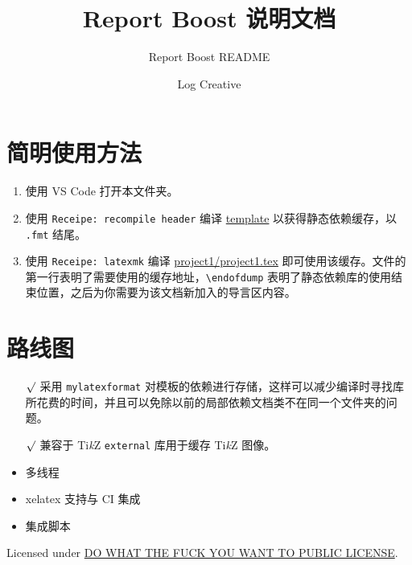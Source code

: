 \endofdump

    \title{Report Boost 说明文档}
    \subtitle{Report Boost README}
    \author{Log Creative}
    \maketitle

\section{简明使用方法}
\begin{enumerate}
    \item 使用 VS Code 打开本文件夹。
    \item 使用 \verb"Receipe: recompile header" 编译 \href{run:../template}{template} 以获得静态依赖缓存，以 \verb".fmt" 结尾。
    \item 使用 \verb"Receipe: latexmk" 编译 \href{run:project1}{project1/project1.tex} 即可使用该缓存。文件的第一行表明了需要使用的缓存地址，\verb"\endofdump" 表明了静态依赖库的使用结束位置，之后为你需要为该文档新加入的导言区内容。
\end{enumerate}

\section{路线图}

\begin{itemize}
    \item[$\surd$] 采用 \verb"mylatexformat" 对模板的依赖进行存储，这样可以减少编译时寻找库所花费的时间，并且可以免除以前的局部依赖文档类不在同一个文件夹的问题。
    \item[$\surd$] 兼容于 Ti\emph{k}Z \verb"external" 库用于缓存 Ti\emph{k}Z 图像。
    \item 多线程
    \item xelatex 支持与 CI 集成
    \item 集成脚本
\end{itemize}

\vfill

{
\scriptsize\centering
Licensed under \href{run:../LICENSE}{DO WHAT THE FUCK YOU WANT TO PUBLIC LICENSE}.
}
